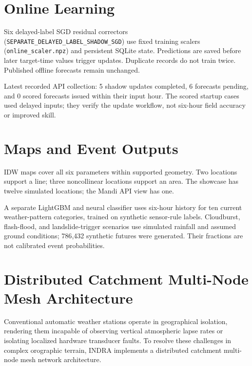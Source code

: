 \documentclass[journal,a4paper]{IEEEtran}
\begin{document}
\section{Online Learning}

Six delayed-label SGD residual correctors (\texttt{SEPARATE\_DELAYED\_LABEL\_SHADOW\_SGD}) use fixed training scalers (\nolinkurl{online_scaler.npz}) and persistent SQLite state. Predictions are saved before later target-time values trigger updates. Duplicate records do not train twice. Published offline forecasts remain unchanged.

Latest recorded API collection: 5 shadow updates completed, 6 forecasts pending, and 0 scored forecasts issued within their input hour. The scored startup cases used delayed inputs; they verify the update workflow, not six-hour field accuracy or improved skill.

\section{Maps and Event Outputs}

IDW maps cover all six parameters within supported geometry. Two locations support a line; three noncollinear locations support an area. The showcase has twelve simulated locations; the Mandi API view has one.

A separate LightGBM and neural classifier uses six-hour history for ten current weather-pattern categories, trained on synthetic sensor-rule labels. Cloudburst, flash-flood, and landslide-trigger scenarios use simulated rainfall and assumed ground conditions; 786{,}432 synthetic futures were generated. Their fractions are not calibrated event probabilities.

\section{Distributed Catchment Multi-Node Mesh Architecture}

Conventional automatic weather stations operate in geographical isolation, rendering them incapable of observing vertical atmospheric lapse rates or isolating localized hardware transducer faults. To resolve these challenges in complex orographic terrain, INDRA implements a distributed catchment multi-node mesh network architecture.
\end{document}
